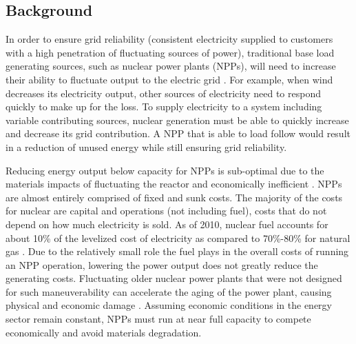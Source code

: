 \documentclass{article}                                                                           %
\begin{document}
\begin{linenumbers}
\section{Background}
In order to ensure grid reliability (consistent electricity supplied to customers with a high penetration of fluctuating sources of power), traditional base load generating sources, such as nuclear power plants (NPPs), will need to increase their ability to fluctuate output to the electric grid \cite {Denholm2011}. For example, when wind decreases its electricity output, other sources of electricity need to respond quickly to make up for the loss. To supply electricity to a system including variable contributing sources, nuclear generation must be able to quickly increase and decrease its grid contribution. A NPP that is able to load follow would result in a reduction of unused energy while still ensuring grid reliability.

Reducing energy output below capacity for NPPs is sub-optimal due to the materials impacts of fluctuating the reactor and economically inefficient \cite{Nuclear2011}. NPPs are almost entirely comprised of fixed and sunk costs. The majority of the costs for nuclear are capital and operations (not including fuel), costs that do not depend on how much electricity is sold. As of 2010, nuclear fuel accounts for about 10\% of the levelized cost of electricity as compared to 70\%-80\% for natural gas \cite{IEA/NEA}. Due to the relatively small role the fuel plays in the overall costs of running an NPP operation, lowering the power output does not greatly reduce the generating costs. Fluctuating older nuclear power plants that were not designed for such maneuverability can accelerate the aging of the power plant, causing physical and economic damage \cite{Nuclear2011}. Assuming economic conditions in the energy sector remain constant, NPPs must run at near full capacity to compete economically and avoid materials degradation.


\end{linenumbers}
\end{document}
